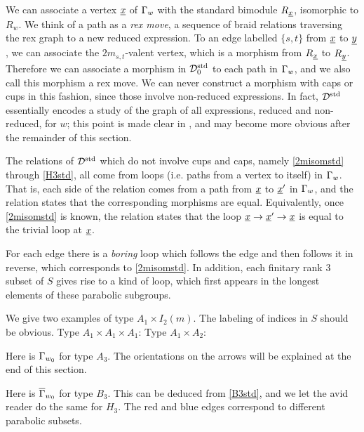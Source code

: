 We can associate a vertex ${\underline{x}}$ of $\Gamma_w$ with the standard bimodule $R_{\underline{x}}$, isomorphic to $R_w$. We think of a path as a \emph{rex move}, a sequence of braid relations traversing the rex graph to a new reduced expression. To an
edge labelled $\{s,t\}$ from ${\underline{x}}$ to ${\underline{y}}$, we can associate the $2m_{s,t}$-valent vertex, which is a morphism from $R_{\underline{x}}$ to $R_{\underline{y}}$. Therefore we can associate a morphism in ${\mathcal{D}}^{\textrm{std}}_0$
to each path in $\Gamma_w$, and we also call this morphism a rex move. We can never construct a morphism with caps or cups in this fashion, since those involve non-reduced expressions. In
fact, ${\mathcal{D}}^{\textrm{std}}$ essentially encodes a study of the graph of all expressions, reduced and non-reduced, for $w$; this point is made clear in \cite{EWFenn}, and may become more obvious after
the remainder of this section.

The relations of ${\mathcal{D}}^{\textrm{std}}$ which do not involve cups and caps, namely \eqref{2misomstd} through \eqref{H3std}, all come from loops (i.e. paths from a vertex to itself) in $\Gamma_w$. That is,
each side of the relation comes from a path from $\underline{x}$ to $\underline{x}'$ in $\Gamma_w$, and the relation states that the corresponding morphisms are equal. Equivalently, once \eqref{2misomstd}
is known, the relation states that the loop $\underline{x} \rightarrow \underline{x}' \rightarrow \underline{x}$ is equal to the trivial loop at $\underline{x}$.

For each edge there is a \emph{boring} loop which follows the edge and then follows it in reverse, which corresponds to \eqref{2misomstd}. In addition, each finitary rank 3 subset of $S$
gives rise to a kind of loop, which first appears in the longest elements of these parabolic subgroups.

\begin{ex} We give two examples of type $A_1 \times I_2(m)$. The labeling of indices in $S$ should be obvious. Type $A_1 \times A_1 \times A_1$:  Type $A_1 \times
A_2$:  \end{ex}

\begin{ex} Here is $\Gamma_{w_0}$ for type $A_3$. The orientations on the arrows will be explained at the end of this section.  \end{ex}

\begin{ex} Here is $\overline{\Gamma}_{w_0}$ for type $B_3$. This can be deduced from \eqref{B3std}, and we let the avid reader do the same for $H_3$. The red and blue edges correspond to different
parabolic subsets.  \end{ex}

